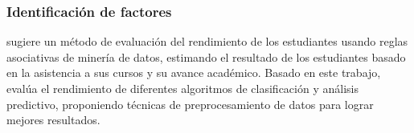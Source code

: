





\subsubsection*{Identificación de factores}
\textcite{borkar2013predicting} sugiere un método de evaluación del rendimiento de los estudiantes usando reglas asociativas de minería de datos, estimando el resultado de los estudiantes basado en la asistencia a sus cursos y su avance académico. Basado en este trabajo, \textcite{shazmeen2013performance} evalúa el rendimiento de diferentes algoritmos de clasificación y análisis predictivo, proponiendo técnicas de preprocesamiento de datos para lograr mejores resultados.


